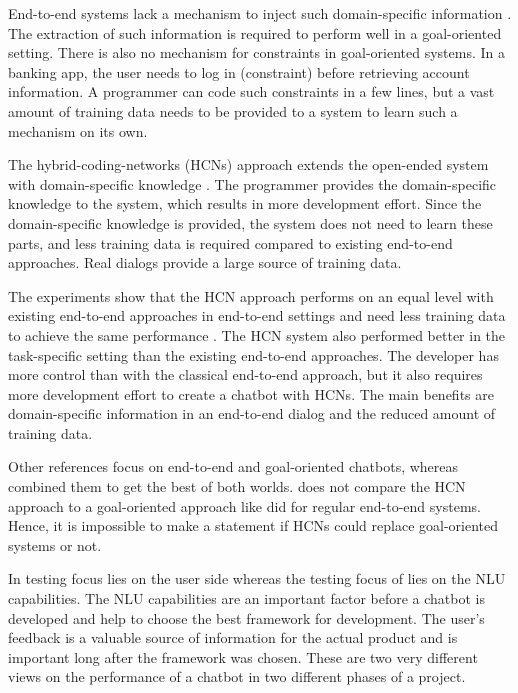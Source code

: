 End-to-end systems lack a mechanism to inject such domain-specific information \cite{williams2017hybrid}.
The extraction of such information is required to perform well in a goal-oriented setting.
There is also no mechanism for constraints in goal-oriented systems.
In a banking app, the user needs to log in (constraint) before retrieving account information.
A programmer can code such constraints in a few lines, but a vast amount of training data needs to be provided to a system to learn such a mechanism on its own.

The hybrid-coding-networks (HCNs) approach extends the open-ended system with domain-specific knowledge \cite{williams2017hybrid}. 
The programmer provides the domain-specific knowledge to the system, which results in more development effort.
Since the domain-specific knowledge is provided, the system does not need to learn these parts, and less training data is required compared to existing end-to-end approaches.
Real dialogs provide a large source of training data.

The experiments show that the HCN approach performs on an equal level with existing end-to-end approaches in end-to-end settings and need less training data to achieve the same performance \cite{williams2017hybrid}. 
The HCN system also performed better in the task-specific setting than the existing end-to-end approaches.
The developer has more control than with the classical end-to-end approach, but it also requires more development effort to create a chatbot with HCNs.
The main benefits are domain-specific information in an end-to-end dialog and the reduced amount of training data.

Other references focus on end-to-end and goal-oriented chatbots, whereas \citet{williams2017hybrid} combined them to get the best of both worlds.
\citet{williams2017hybrid} does not compare the HCN approach to a goal-oriented approach like \citet{bordes2016learning} did for regular end-to-end systems.
Hence, it is impossible to make a statement if HCNs could replace goal-oriented systems or not.

In \citet{evaluateChatbotsShawar2007} testing focus lies on the user side whereas the testing focus of \citet{braunEvaluatingNLU} lies on the NLU capabilities.
The NLU capabilities are an important factor before a chatbot is developed and help to choose the best framework for development.
The user's feedback is a valuable source of information for the actual product and is important long after the framework was chosen.
These are two very different views on the performance of a chatbot in two different phases of a project.

